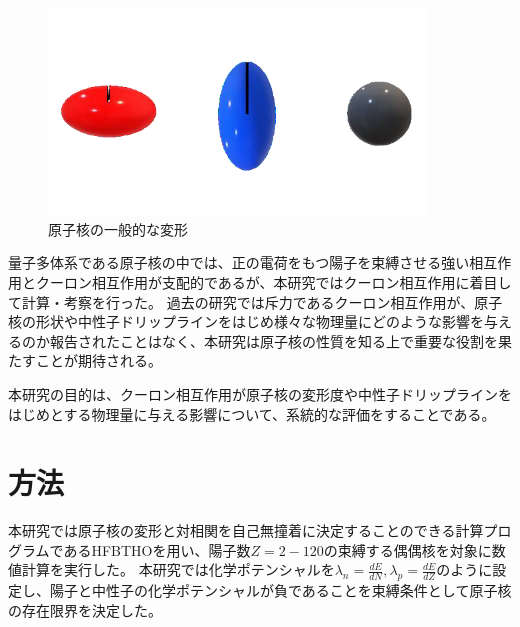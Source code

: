 \documentclass[12pt]{jarticle}
\begin{document}
\begin{figure}[H]
    \centering
    \includegraphics[width=100mm]{../変形図.png}
    \caption{原子核の一般的な変形}\label{fig:deformation}
\end{figure}


量子多体系である原子核の中では、正の電荷をもつ陽子を束縛させる強い相互作用とクーロン相互作用が支配的であるが、本研究ではクーロン相互作用に着目して計算・考察を行った。
過去の研究では斥力であるクーロン相互作用が、原子核の形状や中性子ドリップラインをはじめ様々な物理量にどのような影響を与えるのか報告されたことはなく、本研究は原子核の性質を知る上で重要な役割を果たすことが期待される。

本研究の目的は、クーロン相互作用が原子核の変形度や中性子ドリップラインをはじめとする物理量に与える影響について、系統的な評価をすることである。

\section{方法}
本研究では原子核の変形と対相関を自己無撞着に決定することのできる計算プログラムであるHFBTHOを用い、陽子数$Z=2-120$の束縛する偶偶核を対象に数値計算を実行した。
本研究では化学ポテンシャルを$\lambda_n=\frac{dE}{dN}, \lambda_p=\frac{dE}{dZ}$のように設定し、陽子と中性子の化学ポテンシャルが負であることを束縛条件として原子核の存在限界を決定した。
\end{document}
